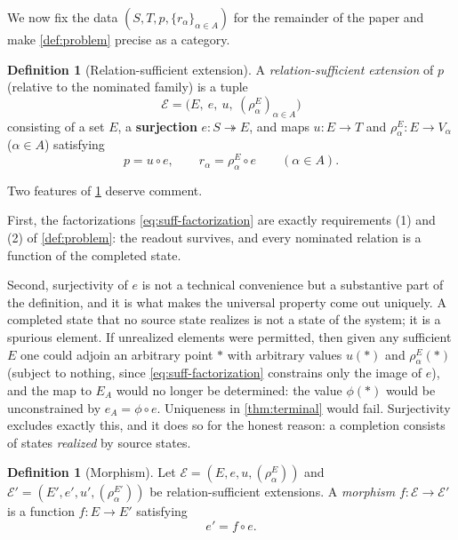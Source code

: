 \documentclass[11pt,reqno]{amsart}
\theoremstyle{plain}
\theoremstyle{definition}
\newtheorem{definition}[theorem]{Definition}
\theoremstyle{remark}
\numberwithin{equation}{section}
\begin{document}
We now fix the data $(S,T,p,\{r_\alpha\}_{\alpha\in A})$ for the remainder of the paper and make
\cref{def:problem} precise as a category.

\begin{definition}[Relation-sufficient extension]
\label{def:sufficient}
A \emph{relation-sufficient extension} of $p$ (relative to the nominated family) is a tuple
\begin{equation}
\label{eq:suff-ext}
\mathcal E=\bigl(E,\ e,\ u,\ (\rho_\alpha^E)_{\alpha\in A}\bigr)
\end{equation}
consisting of a set $E$, a \textbf{surjection} $e\colon S\twoheadrightarrow E$, and maps
$u\colon E\to T$ and $\rho_\alpha^E\colon E\to V_\alpha$ ($\alpha\in A$) satisfying
\begin{equation}
\label{eq:suff-factorization}
p=u\circ e,
\qquad
r_\alpha=\rho_\alpha^E\circ e
\qquad(\alpha\in A).
\end{equation}
\end{definition}

Two features of \cref{def:sufficient} deserve comment.

First, the factorizations \eqref{eq:suff-factorization} are exactly requirements (1) and (2) of
\cref{def:problem}: the readout survives, and every nominated relation is a function of the
completed state.

Second, surjectivity of $e$ is not a technical convenience but a substantive part of the definition,
and it is what makes the universal property come out uniquely. A completed state that no source
state realizes is not a state of the system; it is a spurious element. If unrealized elements were
permitted, then given any sufficient $E$ one could adjoin an arbitrary point $\ast$ with arbitrary
values $u(\ast)$ and $\rho_\alpha^E(\ast)$ (subject to nothing, since \eqref{eq:suff-factorization}
constrains only the image of $e$), and the map to $E_A$ would no longer be determined: the value
$\phi(\ast)$ would be unconstrained by $e_A=\phi\circ e$. Uniqueness in \cref{thm:terminal} would
fail. Surjectivity excludes exactly this, and it does so for the honest reason: a completion consists
of states \emph{realized} by source states.

\begin{definition}[Morphism]
\label{def:morphism}
Let $\mathcal E=(E,e,u,(\rho_\alpha^E))$ and $\mathcal E'=(E',e',u',(\rho_\alpha^{E'}))$ be
relation-sufficient extensions. A \emph{morphism} $f\colon\mathcal E\to\mathcal E'$ is a function
$f\colon E\to E'$ satisfying
\begin{equation}
\label{eq:morphism-over-S}
e'=f\circ e .
\end{equation}
\end{definition}
\end{document}
